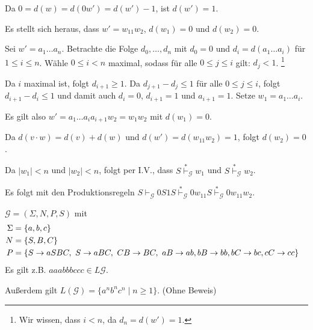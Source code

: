 \begin{Bsp}
\begin{description}[font=\normalfont]
  Da $0 = d(w) = d(0w') = d(w') - 1$, ist $d(w') = 1$.

  Es stellt sich heraus, dass $w' = w_11w_2$, $d(w_1) = 0$ und $d(w_2) = 0$.

  \bigskip
    Sei $w' = a_1 \ldots a_n$.
    Betrachte die Folge $d_0,\ldots,d_n$ mit $d_0 = 0$ und $d_i = d(a_1\ldots a_i)$ für $1 \le i \leq n$.
    Wähle $0 \le i < n$ maximal, sodass für alle $0 \le j \le i$ gilt: $d_j < 1$.%
    \footnote{Wir wissen, dass $i < n$, da $d_n = d(w') = 1$.}

    Da $i$ maximal ist, folgt $d_{i+1} \ge 1$.
    Da $d_{j+1} - d_j \le 1$ für alle $0 \le j \le i$, folgt $d_{i+1} - d_i \le 1$ und damit auch $d_i = 0$, $d_{i+1} = 1$ und $a_{i+1} = 1$.
    Setze $w_1 = a_1\ldots a_{i}$.

    Es gilt also $w' = a_1\ldots a_{i}a_{i+1}w_2 = w_1w_2$ mit $d(w_1) = 0$.

    Da $d(v \cdot w) = d(v) + d(w)$ und $d(w') = d(w_11w_2) = 1$, folgt $d(w_2) = 0$.
  \bigskip
  \goodbreak

  Da $|w_1| < n$ und $|w_2| < n$, folgt per I.V., dass $S \stackrel{*}{\vdash}_{\mathcal{G}} w_1$ und $S \stackrel{*}{\vdash}_{\mathcal{G}} w_2$.

  Es folgt mit den Produktionsregeln $S \vdash_{\mathcal{G}} 0S1S \stackrel{*}{\vdash}_{\mathcal{G}} 0w_11S \stackrel{*}{\vdash}_{\mathcal{G}} 0w_11w_2$.
  \qedhere
\end{description}
\end{Bsp}

\begin{Bsp} $\mathcal{G}=(\Sigma,N,P,S)$ mit
	\begin{align*}
		\Sigma &= \{a,b,c\}\\
		N &= \{S,B,C\}\\
		P &= 
		\begin{aligned}[t]
			 \{ &S \-> aSBC,\ S\->aBC,\ CB\-> BC,\ aB\-> ab,
			bB\-> bb, bC\-> bc, cC\-> cc \}
		\end{aligned}
	\end{align*}
Es gilt z.B. $aaabbbccc\in L\mathcal{G}$.

Außerdem gilt $L(\mathcal{G}) =  \{ a^nb^nc^n \mid n\geq 1 \}$. (Ohne Beweis)
\end{Bsp}

